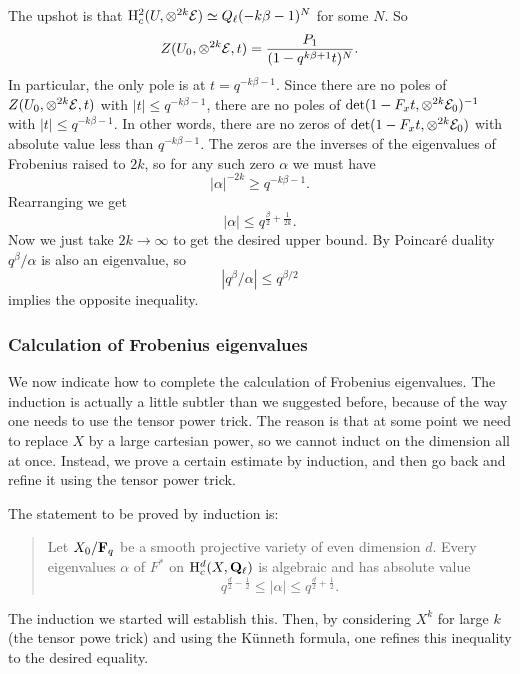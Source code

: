 The upshot is that $\mathrm{H}_c^2(U, \otimes^{2k} \mathcal{E}) \simeq Q_{\ell}(-k\beta-1)^N$ for some $N$. So 
\[
Z(U_0, \otimes^{2k} \mathcal{E}, t) = \frac{P_1}{(1-q^{k \beta+1}t)^N}.
\]
In particular, the only pole is at $t=q^{-k\beta-1}$. Since there are no poles of $Z(U_0, \otimes^{2k} \mathcal{E}, t) $ with $|t| \leq q^{-k\beta-1}$, there are no poles of $\det (1-F_x t,  \otimes^{2k} \mathcal{E}_0)^{-1}$ with $|t| \leq q^{-k\beta-1}$. In other words, there are no zeros of $\det (1-F_x t,  \otimes^{2k} \mathcal{E}_0)$ with absolute value less than $q^{-k \beta-1}$. The zeros are the inverses of the eigenvalues of Frobenius raised to $2k$, so for any such zero $\alpha$ we must have 
\[
|\alpha|^{-2k} \geq q^{-k \beta-1}.
\]
Rearranging we get 
\[
|\alpha| \leq  q^{\frac{\beta}{2} +\frac{1}{2k}}.
\]
Now we just take $2k \rightarrow \infty$ to get the desired upper bound. By Poincar\'{e} duality $q^{\beta}/\alpha$ is also an eigenvalue, so 
\[
|q^{\beta}/\alpha| \leq  q^{\beta/2}  
\]
implies the opposite inequality. 

\subsubsection{Calculation of Frobenius eigenvalues}
We now indicate how to complete the calculation of Frobenius eigenvalues. The induction is actually a little subtler than we suggested before, because of the way one needs to use the tensor power trick. The reason is that at some point we need to replace $X$ by a large cartesian power, so we cannot induct on the dimension all at once. Instead, we prove a certain estimate by induction, and then go back and refine it using the tensor power trick. 

The statement to be proved by induction is: 
\begin{quotation}
Let $X_0/\mathbf{F}_q$ be a smooth projective variety of even dimension $d$. Every eigenvalues $\alpha$ of $F^*$ on $\mathrm{H}_c^d(X,\mathbf{Q}_{\ell})$ is algebraic and has absolute value
\begin{equation}\label{estimate}
q^{\frac{d}{2}-\frac{1}{2}} \leq |\alpha| \leq q^{\frac{d}{2} + \frac{1}{2}}.
\end{equation}
\end{quotation}

The induction we started will establish this. Then, by considering $X^k$ for large $k$ (the tensor powe trick) and using the K\"{u}nneth formula, one refines this inequality to the desired equality. \\

